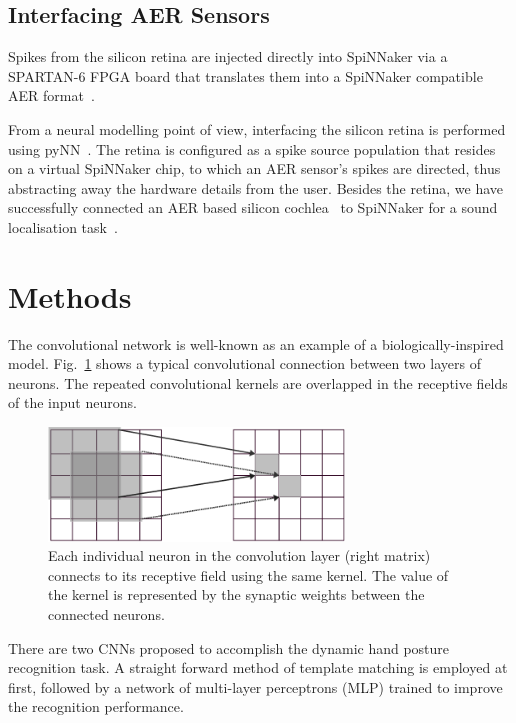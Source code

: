 
\subsection{Interfacing AER Sensors}
Spikes from the silicon retina are injected directly into SpiNNaker via a SPARTAN-6 FPGA board that translates them into a SpiNNaker compatible AER format~\cite{appnote8}. 

From a neural modelling point of view, interfacing the silicon retina is performed using pyNN~\cite{davison2008pynn}. 
The retina is configured as a spike source population that resides on a virtual SpiNNaker chip, to which an AER sensor's spikes are directed, thus abstracting away the hardware details from the user\cite{galluppi2012real}.
Besides the retina, we have successfully connected an AER based silicon cochlea~\cite{5537164} to SpiNNaker for a sound localisation task~\cite{6706931}.

\section{Methods}
The convolutional network is well-known as an example of a biologically-inspired model. 
Fig.~\ref{fig:conv} shows a typical convolutional connection between two layers of neurons. 
The repeated convolutional kernels are overlapped in the receptive fields of the input neurons. 
\begin{figure}
\centering
	\includegraphics[width=0.7\textwidth]{pics_icann/conv.pdf}
	\caption{Each individual neuron in the convolution layer (right matrix) connects to its receptive field using the same kernel. The value of the kernel is represented by the synaptic weights between the connected neurons.}
	\label{fig:conv}
\end{figure}

There are two CNNs proposed to accomplish the dynamic hand posture recognition task.
A straight forward method of template matching is employed at first, followed by a network of multi-layer perceptrons (MLP) trained to improve the recognition performance.



